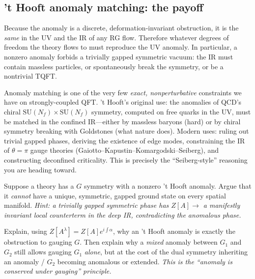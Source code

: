 \documentclass[11pt]{article}
\begin{document}
\subsection{'t Hooft anomaly matching: the payoff}

\begin{ttheorem}
Because the anomaly is a discrete, deformation-invariant obstruction, it is the
\emph{same} in the UV and the IR of any RG flow. Therefore whatever degrees of freedom
the theory flows to must reproduce the UV anomaly. In particular, a nonzero anomaly
forbids a trivially gapped symmetric vacuum: the IR must contain massless particles, or
spontaneously break the symmetry, or be a nontrivial TQFT.
\end{ttheorem}

\begin{iintuition}
Anomaly matching is one of the very few \emph{exact, nonperturbative} constraints we
have on strongly-coupled QFT. 't Hooft's original use: the anomalies of QCD's chiral
$\mathrm{SU}(N_f)\times\mathrm{SU}(N_f)$ symmetry, computed on free quarks in the UV,
must be matched in the confined IR---either by massless baryons (hard) or by chiral
symmetry breaking with Goldstones (what nature does). Modern uses: ruling out trivial
gapped phases, deriving the existence of edge modes, constraining the IR of
$\theta=\pi$ gauge theories (Gaiotto--Kapustin--Komargodski--Seiberg), and constructing
deconfined criticality. This is precisely the ``Seiberg-style'' reasoning you are
heading toward.
\end{iintuition}

\begin{xca}
Suppose a theory has a $G$ symmetry with a nonzero 't Hooft anomaly. Argue that it
\emph{cannot} have a unique, symmetric, gapped ground state on every spatial manifold.
\emph{Hint: a trivially gapped symmetric phase has $Z[A]\to$ a manifestly invariant
local counterterm in the deep IR, contradicting the anomalous phase.}
\end{xca}

\begin{xca}
Explain, using $Z[A^\lambda]=Z[A]e^{i\int\alpha}$, why an 't Hooft anomaly is exactly
the obstruction to gauging $G$. Then explain why a \emph{mixed} anomaly between $G_1$
and $G_2$ still allows gauging $G_1$ \emph{alone}, but at the cost of the dual symmetry
inheriting an anomaly / $G_2$ becoming anomalous or extended. \emph{This is the
``anomaly is conserved under gauging'' principle.}
\end{xca}
\end{document}
